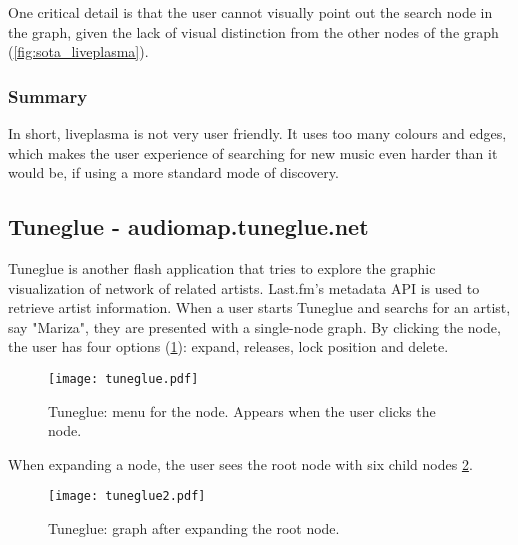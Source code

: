       One critical detail is that the user cannot visually point out the search node in the graph, given the lack of visual distinction from the other nodes of the graph (\ref{fig:sota_liveplasma}).


    \subsubsection{Summary} %
    \label{ssub:liveplasma_summary}

      In short, liveplasma is not very user friendly. 
      It uses too many colours and edges, which makes the user experience of searching for new music even harder than it would be, if using a more standard mode of discovery.



  \subsection{Tuneglue - audiomap.tuneglue.net} %
  \label{sub:tuneglue}

    Tuneglue is another flash application that tries to explore the graphic visualization of network of related artists.
    Last.fm's metadata API is used to retrieve artist information.
    When a user starts Tuneglue and searchs for an artist, say "Mariza", they are presented with a single-node graph.
    By clicking the node, the user has four options (\ref{fig:sota_tuneglue}): expand, releases, lock position and delete.


    \begin{figure}[hb]
      \begin{center}
        \texttt{[image: tuneglue.pdf]}
      \end{center}
      \caption{Tuneglue: menu for the node. Appears when the user clicks the node.}
      \label{fig:sota_tuneglue}
    \end{figure}

    When expanding a node, the user sees the root node with six child nodes \ref{fig:sota_tuneglue2}.

    \begin{figure}[H]
      \begin{center}
        \texttt{[image: tuneglue2.pdf]}
      \end{center}
      \caption{Tuneglue: graph after expanding the root node.}
      \label{fig:sota_tuneglue2}
    \end{figure}

